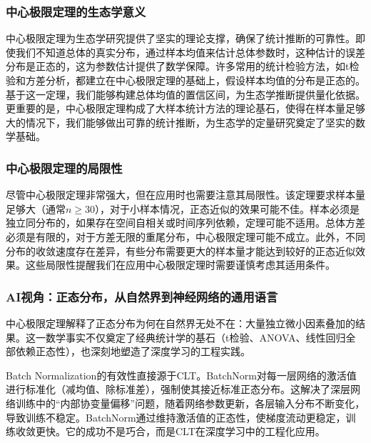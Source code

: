 \documentclass[
  twoside,12pt,fontset=none]{ctexbook}
\begin{document}
\hypertarget{ux4e2dux5fc3ux6781ux9650ux5b9aux7406ux7684ux751fux6001ux5b66ux610fux4e49}{%
\subsubsection{中心极限定理的生态学意义}\label{ux4e2dux5fc3ux6781ux9650ux5b9aux7406ux7684ux751fux6001ux5b66ux610fux4e49}}

中心极限定理为生态学研究提供了坚实的理论支撑，确保了统计推断的可靠性。即使我们不知道总体的真实分布，通过样本均值来估计总体参数时，这种估计的误差分布是正态的，这为参数估计提供了数学保障。许多常用的统计检验方法，如t检验和方差分析，都建立在中心极限定理的基础上，假设样本均值的分布是正态的。基于这一定理，我们能够构建总体均值的置信区间，为生态学推断提供量化依据。更重要的是，中心极限定理构成了大样本统计方法的理论基石，使得在样本量足够大的情况下，我们能够做出可靠的统计推断，为生态学的定量研究奠定了坚实的数学基础。

\hypertarget{ux4e2dux5fc3ux6781ux9650ux5b9aux7406ux7684ux5c40ux9650ux6027}{%
\subsubsection{中心极限定理的局限性}\label{ux4e2dux5fc3ux6781ux9650ux5b9aux7406ux7684ux5c40ux9650ux6027}}

尽管中心极限定理非常强大，但在应用时也需要注意其局限性。该定理要求样本量足够大（通常\(n \geq 30\)），对于小样本情况，正态近似的效果可能不佳。样本必须是独立同分布的，如果存在空间自相关或时间序列依赖，定理可能不适用。总体方差必须是有限的，对于方差无限的重尾分布，中心极限定理可能不成立。此外，不同分布的收敛速度存在差异，有些分布需要更大的样本量才能达到较好的正态近似效果。这些局限性提醒我们在应用中心极限定理时需要谨慎考虑其适用条件。

\hypertarget{aiux89c6ux89d2ux6b63ux6001ux5206ux5e03ux4eceux81eaux7136ux754cux5230ux795eux7ecfux7f51ux7edcux7684ux901aux7528ux8bedux8a00}{%
\subsubsection{AI视角：正态分布，从自然界到神经网络的通用语言}\label{aiux89c6ux89d2ux6b63ux6001ux5206ux5e03ux4eceux81eaux7136ux754cux5230ux795eux7ecfux7f51ux7edcux7684ux901aux7528ux8bedux8a00}}

中心极限定理解释了正态分布为何在自然界无处不在：大量独立微小因素叠加的结果。这一数学事实不仅奠定了经典统计学的基石（t检验、ANOVA、线性回归全部依赖正态性），也深刻地塑造了深度学习的工程实践。

Batch Normalization的有效性直接源于CLT。BatchNorm对每一层网络的激活值进行标准化（减均值、除标准差），强制使其接近标准正态分布。这解决了深层网络训练中的``内部协变量偏移''问题，随着网络参数更新，各层输入分布不断变化，导致训练不稳定。BatchNorm通过维持激活值的正态性，使梯度流动更稳定，训练收敛更快。它的成功不是巧合，而是CLT在深度学习中的工程化应用。
\end{document}
